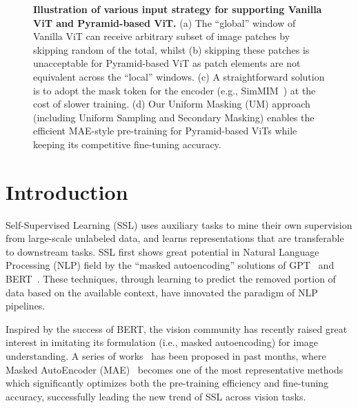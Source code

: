\documentclass{article}
\begin{document}
\begin{figure}[t]
	\vspace{0pt}
	\begin{center}
		\setlength{\fboxrule}{0pt}
	\end{center}	
	\vspace{-9pt}
	\caption{\textbf{Illustration of various input strategy for supporting Vanilla ViT and Pyramid-based ViT.} (a) The ``global'' window of Vanilla ViT can receive arbitrary subset of image patches by skipping random  of the total, whilst (b) skipping these  patches is unacceptable for Pyramid-based ViT as patch elements are not equivalent across the ``local'' windows. (c) A straightforward solution is to adopt
    the mask token for the encoder (e.g.,  SimMIM~\cite{xie2021simmim}) at the cost of slower training. (d) Our Uniform Masking (UM) approach (including Uniform Sampling and Secondary Masking) enables the efficient MAE-style pre-training for Pyramid-based ViTs while keeping its competitive fine-tuning accuracy.
}
	\label{fig_pipeline}
	\vspace{-10pt}
\end{figure}

\section{Introduction}
Self-Supervised Learning (SSL) uses auxiliary tasks to mine their own supervision from large-scale unlabeled data, and learns representations that are transferable to downstream tasks. SSL first shows great potential in Natural Language Processing (NLP) field by the ``masked autoencoding'' solutions of GPT~\cite{radford2018improving,radford2019language,brown2020language} and BERT~\cite{devlin2018bert}. These techniques, through learning to predict the removed portion of data based on the available context, have innovated the paradigm of NLP pipelines.

Inspired by the success of BERT, the vision community has recently raised great interest in imitating its formulation (i.e., masked autoencoding) for image understanding. A series of works~\cite{bao2021beit,dong2021peco,zhou2021ibot,chen2022context,he2021masked,xie2021simmim,wei2021masked,tong2022videomae} has been proposed in past months, where Masked AutoEncoder (MAE)~\cite{he2021masked} becomes one of the most representative methods which significantly optimizes both the pre-training efficiency and fine-tuning accuracy, successfully leading the new trend of SSL across vision tasks.
\end{document}
